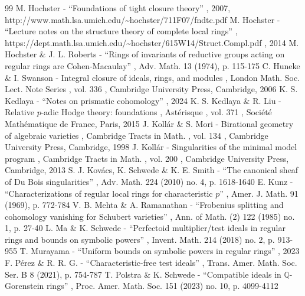 \documentclass[11pt]{article}
\theoremstyle{plain}
\theoremstyle{definition}
\numberwithin{equation}{theorem}
\begin{document}
\begin{thebibliography}{99}
 M. Hochster - “Foundations of tight closure theory” , 2007, http://www.math.lsa.umich.edu/\textasciitilde{}hochster/711F07/fndtc.pdf
 M. Hochster - “Lecture notes on the structure theory of complete local rings” , https://dept.math.lsa.umich.edu/\textasciitilde{}hochster/615W14/Struct.Compl.pdf , 2014
 M. Hochster \& J. L. Roberts - “Rings of invariants of reductive groups acting on regular rings are Cohen-Macaulay” , Adv. Math. 13 (1974), p. 115-175
 C. Huneke \& I. Swanson - Integral closure of ideals, rings, and modules , London Math. Soc. Lect. Note Series , vol. 336 , Cambridge University Press, Cambridge, 2006
 K. S. Kedlaya - “Notes on prismatic cohomology” , 2024
 K. S. Kedlaya \& R. Liu - Relative $p$-adic Hodge theory: foundations , Astérisque , vol. 371 , Société Mathématique de France, Paris, 2015
 J. Kollár \& S. Mori - Birational geometry of algebraic varieties , Cambridge Tracts in Math. , vol. 134 , Cambridge University Press, Cambridge, 1998
 J. Kollár - Singularities of the minimal model program , Cambridge Tracts in Math. , vol. 200 , Cambridge University Press, Cambridge, 2013
 S. J. Kovács, K. Schwede \& K. E. Smith - “The canonical sheaf of Du Bois singularities” , Adv. Math. 224 (2010) no. 4, p. 1618-1640
 E. Kunz - “Characterizations of regular local rings for characteristic $p$” , Amer. J. Math. 91 (1969), p. 772-784
 V. B. Mehta \& A. Ramanathan - “Frobenius splitting and cohomology vanishing for Schubert varieties” , Ann. of Math. (2) 122 (1985) no. 1, p. 27-40
 L. Ma \& K. Schwede - “Perfectoid multiplier/test ideals in regular rings and bounds on symbolic powers” , Invent. Math. 214 (2018) no. 2, p. 913-955
 T. Murayama - “Uniform bounds on symbolic powers in regular rings” , 2023
 F. Pérez \& R. R. G. - “Characteristic-free test ideals” , Trans. Amer. Math. Soc. Ser. B 8 (2021), p. 754-787
 T. Polstra \& K. Schwede - “Compatible ideals in $\mathbb{Q}$-Gorenstein rings” , Proc. Amer. Math. Soc. 151 (2023) no. 10, p. 4099-4112

\end{thebibliography}
\end{document}
